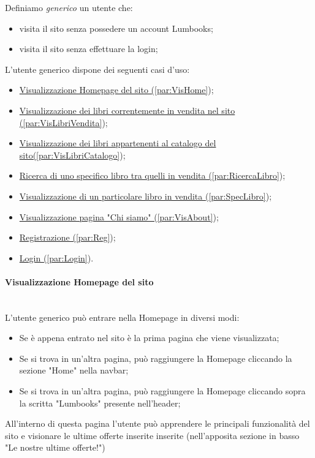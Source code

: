 Definiamo \textit{generico} un utente che:
\begin{itemize}
	\item visita il sito senza possedere un account Lumbooks;
	\item visita il sito senza effettuare la login;
\end{itemize}

L'utente generico dispone dei seguenti casi d'uso:
\begin{itemize}
	\item \hyperref[par:VisHome]{Visualizzazione Homepage del sito (\ref{par:VisHome}});
	\item \hyperref[par:VisLibriVendita]{Visualizzazione dei libri correntemente in vendita nel sito (\ref{par:VisLibriVendita}});
	\item \hyperref[par:VisLibriCatalogo]{Visualizzazione dei libri appartenenti al catalogo del sito(\ref{par:VisLibriCatalogo}});
	\item \hyperref[par:RicercaLibro]{Ricerca di uno specifico libro tra quelli in vendita (\ref{par:RicercaLibro}});
	\item \hyperref[par:SpecLibro]{Visualizzazione di un particolare libro in vendita (\ref{par:SpecLibro}});
	\item \hyperref[par:VisAbout]{Visualizzazione pagina "Chi siamo" (\ref{par:VisAbout}});	
	\item \hyperref[par:Reg]{Registrazione (\ref{par:Reg}});
	\item \hyperref[par:Login]{Login (\ref{par:Login}}).
\end{itemize}

\paragraph{Visualizzazione Homepage del sito}\mbox{}\\
\label{par:VisHome}
L'utente generico può entrare nella Homepage in diversi modi:
\begin{itemize}
	\item Se è appena entrato nel sito è la prima pagina che viene visualizzata;
	\item Se si trova in un'altra pagina, può raggiungere la Homepage cliccando la sezione "Home" nella navbar;
	\item Se si trova in un'altra pagina, può raggiungere la Homepage cliccando sopra la scritta "Lumbooks" presente nell'header;
\end{itemize}
All'interno di questa pagina l'utente può apprendere le principali funzionalità del sito e visionare le ultime offerte inserite inserite (nell'apposita sezione in basso "Le nostre ultime offerte!")




